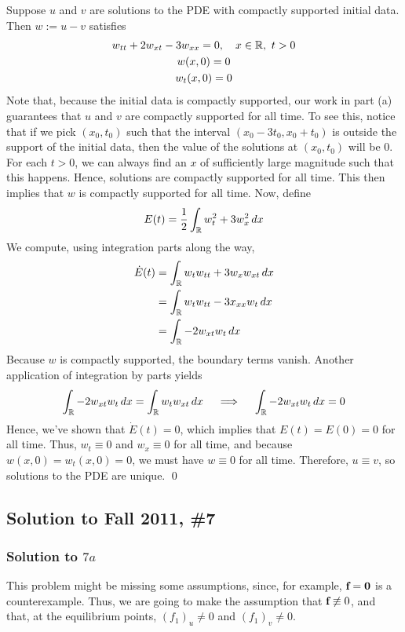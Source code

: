 Suppose $u$ and $v$ are solutions to the PDE with compactly supported initial data. Then $w:=u-v$ satisfies
\begin{gather*}
w_{tt} + 2w_{xt} - 3w_{xx} = 0, \quad x \in \mathbb{R}, \,\, t > 0 \\
w(x,0) = 0 \\
w_t(x,0) = 0
\end{gather*}
Note that, because the initial data is compactly supported, our work in part (a) guarantees that $u$ and $v$ are compactly supported for all time. To see this, notice that if we pick $(x_0,t_0)$ such that the interval $(x_0 - 3t_0, x_0 + t_0)$ is outside the support of the initial data, then the value of the solutions at $(x_0,t_0)$ will be 0. For each $t > 0$, we can always find an $x$ of sufficiently large magnitude such that this happens. Hence, solutions are compactly supported for all time. This then implies that $w$ is compactly supported for all time. Now, define
$$ E(t) = \frac{1}{2} \int_{\mathbb{R}} w_t^2 + 3w_x^2 \, dx $$
We compute, using integration parts along the way,
\begin{align*}
\dot{E}(t) &= \int_{\mathbb{R}} w_t w_{tt} + 3w_x w_{xt} \, dx \\
&=\int_{\mathbb{R}} w_t w_{tt} - 3x_{xx} w_t \, dx \\
&= \int_{\mathbb{R}} -2w_{xt} w_t \, dx
\end{align*}
Because $w$ is compactly supported, the boundary terms vanish. Another application of integration by parts yields
$$ \int_{\mathbb{R}} -2w_{xt} w_t \, dx = \int_{\mathbb{R}} w_{t} w_{xt} \, dx \quad \implies \quad \int_{\mathbb{R}} -2w_{xt} w_t \, dx = 0 $$
Hence, we've shown that $\dot{E}(t) = 0$, which implies that $E(t) = E(0) = 0$ for all time. Thus, $w_t \equiv 0$ and $w_x \equiv 0$ for all time, and because $w(x,0) = w_t(x,0) = 0$, we must have $w \equiv 0$ for all time. Therefore, $u \equiv v$, so solutions to the PDE are unique. \hfill \qed









\subsection*{Solution to Fall 2011, \#7}
\label{F11Q7}

\subsubsection*{Solution to $7a$}
This problem might be missing some assumptions, since, for example, $\textbf{f}=\mathbf{0}$ is a counterexample. Thus, we are going to make the assumption that $\textbf{f} \not\equiv 0$, and that, at the equilibrium points, $(f_1)_u \neq 0$ and $(f_1)_v \neq 0$.

